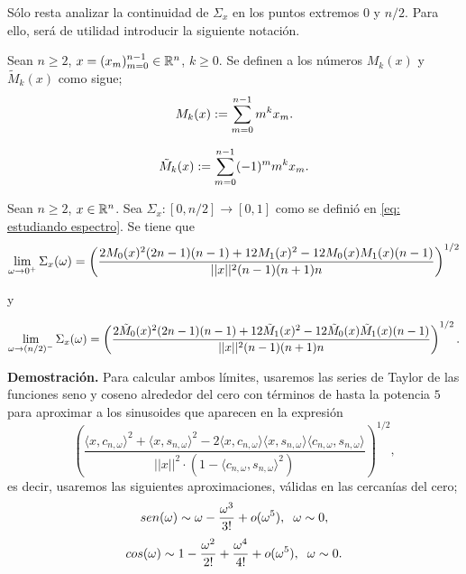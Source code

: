 Sólo resta analizar la continuidad de 
$\Sigma_{x}$ en los puntos extremos $0$ y $n/2$.
Para ello,
será de utilidad introducir la siguiente notación.
\begin{defi}
\label{def: momentos de x}
Sean $n \geq 2$, $x= (x_{m})_{m=0}^{n-1} \in \mathbb{R}^{n}$, $k \geq 0$.
Se definen a los números $M_{k}(x)$ y 
$\tilde{M}_{k}(x)$ como sigue;
	\begin{equation}
	\label{eq: momento k esimo de x}
	M_{k}(x) := \sum\limits_{m=0}^{n-1}m^{k}x_{m}.
	\end{equation}
	
	\begin{equation}
	\label{eq: momento skew k esimo de x}
	\tilde{M}_{k}(x) := \sum\limits_{m=0}^{n-1}(-1)^{m}m^{k}x_{m}.
	\end{equation}
\end{defi}


\begin{teo}
\label{teo: limite del espectro por cero}
Sean $n \geq 2$, $x \in \mathbb{R}^{n}$.
Sea $\Sigma_{x}: [0, n/2] \rightarrow [0,1]$ 
como se definió en \eqref{eq: estudiando espectro}.
Se tiene que 
\begin{equation}
\label{eq: limite del espectro a cero}
\lim\limits_{\omega \rightarrow 0^{+}}{\Sigma_{x}(\omega)}
=
\left(
\frac{
2M_{0}(x)^{2}(2n-1)(n-1) + 12M_{1}(x)^{2} - 12M_{0}(x)M_{1}(x)(n-1)
}{
||x||^{2} (n-1)(n+1)n}
\right)^{1/2}
\end{equation}

y

\begin{equation}
\label{eq: limite del espectro a n medios}
\lim\limits_{\omega \rightarrow (n/2)^{-}}{\Sigma_{x}(\omega)}
= \left(
\frac{
2\tilde{M}_{0}(x)^{2}(2n-1)(n-1) + 12\tilde{M}_{1}(x)^{2} - 
12\tilde{M}_{0}(x)\tilde{M}_{1}(x)(n-1)
}{
||x||^{2} (n-1)(n+1)n}
\right)^{1/2}.
\end{equation}
\end{teo}
\noindent
\textbf{Demostración.}
Para calcular ambos límites, 
usaremos las series de Taylor
de las funciones seno y coseno alrededor del cero
con términos de hasta la potencia $5$ para aproximar
a los sinusoides que aparecen en la expresión 
\begin{equation}
\label{eq1: 22May}
\left(		  
		  \frac{\langle x, c_{n, \omega } \rangle^{2} +  \langle x, s_{n, \omega } \rangle^{2}	
	       -2  \langle x, c_{n, \omega } \rangle \langle x, s_{n, \omega } \rangle \langle c_{n, \omega }, s_{n, \omega } \rangle}{ || x ||^{2} \cdot
	       (1- \langle c_{n, \omega }, s_{n, \omega } \rangle^{2})}	  
\right) ^{1/2},
\end{equation}
es decir, usaremos
las siguientes aproximaciones, válidas en las cercanías
del cero;
\[
sen(\omega) 
\sim
\omega - \frac{\omega^{3}}{3!}
+ o(\omega^{5}),
\hspace{0.2cm} \omega \sim 0,
\]
\[
cos(\omega) \sim 1 - \frac{\omega^{2}}{2!}
+ \frac{\omega^{4}}{4!} + o(\omega^{5}),
\hspace{0.2cm} \omega \sim 0.
\]

